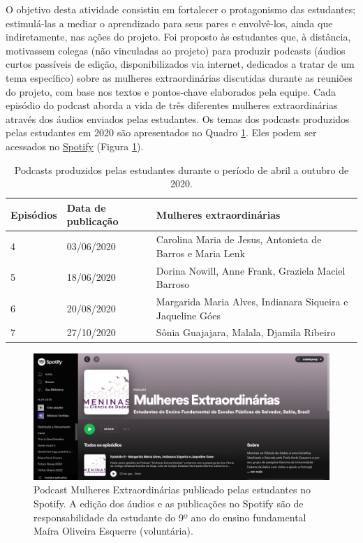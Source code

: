 \documentclass[
]{book}
\begin{document}
O objetivo desta atividade consistiu em fortalecer o protagonismo das estudantes; estimulá-las a mediar o aprendizado para seus pares e envolvê-los, ainda que indiretamente, nas ações do projeto.
Foi proposto às estudantes que, à distância, motivassem colegas (não vinculadas ao projeto) para produzir podcasts (áudios curtos passíveis de edição, disponibilizados via internet, dedicados a tratar de um tema específico) sobre as mulheres extraordinárias discutidas durante as reuniões do projeto, com base nos textos e pontos-chave elaborados pela equipe.
Cada episódio do podcast aborda a vida de três diferentes mulheres extraordinárias através dos áudios enviados pelas estudantes. Os temas dos podcasts produzidos pelas estudantes em 2020 são apresentados no Quadro \ref{tab:quadro4}. Eles podem ser acessados no \href{https://open.spotify.com/show/4hHoJYZVxVPOYrAT2OGuB8}{Spotify} (Figura \ref{fig:podcast}).

\begin{table}

\caption{\label{tab:quadro4}Podcasts produzidos pelas estudantes durante o período de abril a outubro de 2020.}
\centering
\begin{tabular}[t]{l|l|l}
\hline
Episódios & Data de publicação & Mulheres extraordinárias\\
\hline
4 & 03/06/2020 & Carolina Maria de Jesus, Antonieta de Barros e Maria Lenk\\
\hline
5 & 18/06/2020 & Dorina Nowill, Anne Frank, Graziela Maciel Barroso\\
\hline
6 & 20/08/2020 & Margarida Maria Alves, Indianara Siqueira e Jaqueline Góes\\
\hline
7 & 27/10/2020 & Sônia Guajajara, Malala, Djamila Ribeiro\\
\hline
\end{tabular}
\end{table}

\begin{figure}
\includegraphics[width=26.58in]{images/image95} \caption{Podcast Mulheres Extraordinárias publicado pelas estudantes no Spotify. A edição dos áudios e as publicações no Spotify são de responsabilidade da estudante do 9º ano do ensino fundamental Maíra Oliveira Esquerre (voluntária).}\label{fig:podcast}
\end{figure}
\end{document}
